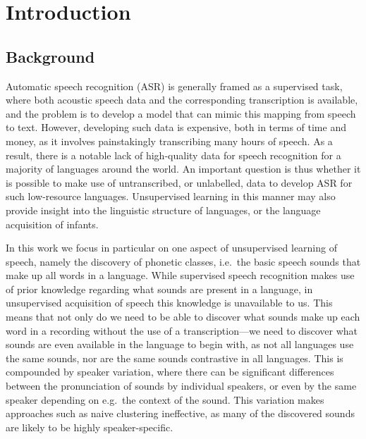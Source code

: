 %
%
%

% 

\chapter{Introduction}
\section{Background}
Automatic speech recognition (ASR) is generally framed as a supervised task, where both acoustic speech data and the corresponding transcription is available, and the problem is to develop a model that can mimic this mapping from speech to text.
However, developing such data is expensive, both in terms of time and money, as it involves painstakingly transcribing many hours of speech.
As a result, there is a notable lack of high-quality data for speech recognition for a majority of languages around the world.
An important question is thus whether it is possible to make use of untranscribed, or unlabelled, data to develop ASR for such low-resource languages.
Unsupervised learning in this manner may also provide insight into the linguistic structure of languages, or the language acquisition of infants.

In this work we focus in particular on one aspect of unsupervised learning of speech, namely the discovery of phonetic classes, i.e.\ the basic speech sounds that make up all words in a language.
While supervised speech recognition makes use of prior knowledge regarding what sounds are present in a language, in unsupervised acquisition of speech this knowledge is unavailable to us.
This means that not only do we need to be able to discover what sounds make up each word in a recording without the use of a transcription---we need to discover what sounds are even available in the language to begin with, as not all languages use the same sounds, nor are the same sounds contrastive in all languages.
This is compounded by speaker variation, where there can be significant differences between the pronunciation of sounds by individual speakers, or even by the same speaker depending on e.g.\ the context of the sound.
This variation makes approaches such as naive clustering ineffective, as many of the discovered sounds are likely to be highly speaker-specific.

